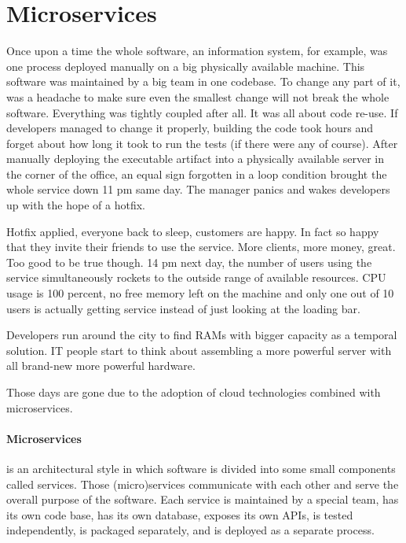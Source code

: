 \documentclass[a4]{report}
\begin{document}
    \section{Microservices}
    Once upon a time the whole software, an information system, for example, was one process deployed manually on a big
    physically available machine.
    This software was maintained by a big team in one codebase.
    To change any part of it, was a headache to make sure even the smallest change will not break the whole software.
    Everything was tightly coupled after all.
    It was all about code re-use.
    If developers managed to change it properly, building the code took hours and forget about how long it took to
    run the tests (if there were any of course).
    After manually deploying the executable artifact into a physically available server in the corner of the office, an
    equal sign forgotten in a loop condition brought the whole service down 11 pm same day.
    The manager panics and wakes developers up with the hope of a hotfix.

    Hotfix applied, everyone back to sleep, customers are happy.
    In fact so happy that they invite their friends to use the service.
    More clients, more money, great.
    Too good to be true though.
    14 pm next day, the number of users using the service simultaneously rockets to the outside range of available resources.
    CPU usage is 100 percent, no free memory left on the machine and only one out of 10 users is actually getting
    service instead of just looking at the loading bar.

    Developers run around the city to find RAMs with bigger capacity as a temporal solution.
    IT people start to think about assembling a more powerful server with all brand-new more powerful hardware.

    Those days are gone due to the adoption of cloud technologies combined with microservices.

    \paragraph{Microservices} is an architectural style in which software is divided into some small components
    called services.
    Those (micro)services communicate with each other and serve the overall purpose of the software.
    Each service is maintained by a special team, has its own code base, has its own database, exposes its own APIs, is tested independently, is packaged separately, and is deployed as a separate process.
\end{document}
